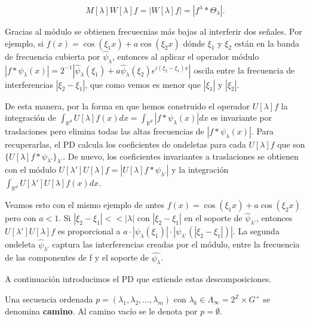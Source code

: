 $$M[\lambda]W[\lambda]f=|W[\lambda]f|=|f^\lambda \ast \Theta_\lambda|.$$

\noindent Gracias al módulo se obtienen frecuecnias más bajas al interferir dos señales. Por ejemplo, si $f(x)=\cos(\xi_1 x)+a\cos(\xi_2 x)$ dónde $\xi_1$ y $\xi_2$ están en la banda de frecuencia cubierta por $\widehat{\psi}_\lambda$, entonces al aplicar el operador módulo $|f \ast \psi_\lambda (x) |=2^{-1} |\widehat{\psi}_\lambda(\xi_1)+a\widehat{\psi}_\lambda(\xi_2)e^{i(\xi_2-\xi_1)x}|$ oscila entre la frecuencia de interferencias $|\xi_2-\xi_1|$, que como vemos es menor que $|\xi_1|$ y $|\xi_2|$.

\medskip

\noindent De esta manera, por la forma en que hemos construido el operador $U[\lambda] f$ la integración de $\int_{\mathbb{R}^d}U[\lambda]f(x) dx= \int_{\mathbb{R}^d} | f \ast \psi_\lambda(x)|dx$ es invariante por traslaciones pero elimina todas las altas frecuencias de $|f \ast \psi_\lambda(x)|$. Para recuperarlas, el PD calcula los coeficientes de ondeletas para cada $U[\lambda]f$ que son $\lbrace U[\lambda]f \ast \psi_{\lambda'}\rbrace_{\lambda'}$. De nuevo, los coeficientes invariantes a traslaciones se obtienen con el módulo $U[\lambda']U[\lambda]f=|U[\lambda]f \ast \psi_{\lambda'}|$ y la integración $\int_{\mathbb{R}^d} U[\lambda']U[\lambda]f(x) dx$. 

\medskip

\noindent Veamos esto con el mismo ejemplo de antes $f(x)=\cos(\xi_1 x)+a\cos(\xi_2 x)$ pero con $a<1$. Si $|\xi_2-\xi_1| << |\lambda|$ con $|\xi_2 - \xi_1|$ en el soporte de $\widehat{\psi}_{\lambda'}$, entonces $U[\lambda']U[\lambda]f$ es proporcional a $a\cdot |\psi_\lambda(\xi_1)|\cdot |\psi_{\lambda'}(|\xi_2-\xi_1|)|$. La segunda ondeleta $\widehat{\psi}_{\lambda'}$ captura las interferencias creadas por el módulo, entre la frecuencia de las componentes de f y el soporte de $\widehat{\psi_\lambda}$.

\medskip

\noindent A continuación introducimos el PD que extiende estas descomposiciones.

\medskip

\begin{definicion}
Una secuencia ordenada $p=(\lambda_1,\lambda_2, ... , \lambda_m)$ con $\lambda_k \in \Lambda_\infty=2^{\mathbb{Z}} \times G^{+} $ se denomina \textbf{camino}. Al camino vacío se le denota por $p=\emptyset$. 
\end{definicion}


